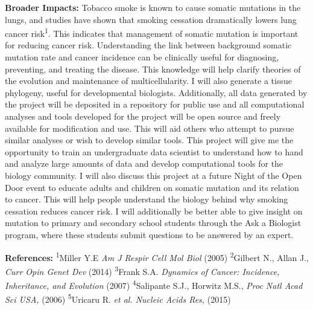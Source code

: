 \documentclass[12pt]{article}
\begin{document}
\textbf{Broader Impacts:}
Tobacco smoke is known to cause somatic mutations in the lungs, and studies have shown that smoking cessation dramatically lowers lung cancer risk\textsuperscript{1}.
This indicates that management of somatic mutation is important for reducing cancer risk.
Understanding the link between background somatic mutation rate and cancer incidence can be clinically useful for diagnosing, preventing, and treating the disease.
This knowledge will help clarify theories of the evolution and maintenance of multicellularity.
I will also generate a tissue phylogeny, useful for developmental biologists.
Additionally, all data generated by the project will be deposited in a repository for public use and all computational analyses and tools developed for the project will be open source and freely available for modification and use.
This will aid others who attempt to pursue similar analyses or wish to develop similar tools.
This project will give me the opportunity to train an undergraduate data scientist to understand how to hand and analyze large amounts of data and develop computational tools for the biology community.
I will also discuss this project at a future Night of the Open Door event to educate adults and children on somatic mutation and its relation to cancer.
This will help people understand the biology behind why smoking cessation reduces cancer risk.
I will additionally be better able to give insight on mutation to primary and secondary school students through the Ask a Biologist program, where these students submit questions to be answered by an expert.

\begin{footnotesize}
\textbf{References:}
\textsuperscript{1}Miller Y.E \textit{Am J Respir Cell Mol Biol} (2005)
\textsuperscript{2}Gilbert N., Allan J., \textit{Curr Opin Genet Dev} (2014)
\textsuperscript{3}Frank S.A. \textit{Dynamics of Cancer: Incidence, Inheritance, and Evolution} (2007)
\textsuperscript{4}Salipante S.J., Horwitz M.S., \textit{Proc Natl Acad Sci USA,} (2006)
\textsuperscript{5}Uricaru R. \textit{et al. Nucleic Acids Res,} (2015)
\end{footnotesize}
\end{document}
